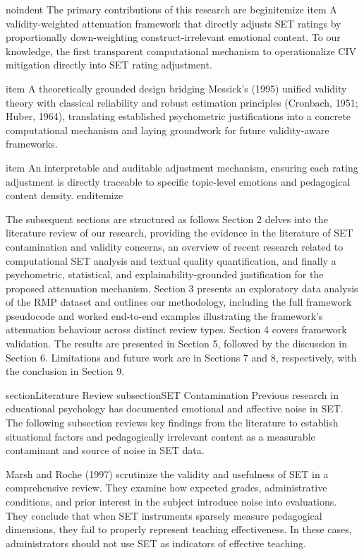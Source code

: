 noindent The primary contributions of this research are
begin{itemize}
    item A validity-weighted attenuation framework that directly adjusts SET ratings by proportionally down-weighting construct-irrelevant emotional content. To our knowledge, the first transparent computational mechanism to operationalize CIV mitigation directly into SET rating adjustment.

    item A theoretically grounded design bridging Messick's (1995) unified validity theory with classical reliability and robust estimation principles (Cronbach, 1951; Huber, 1964), translating established psychometric justifications into a concrete computational mechanism and laying groundwork for future validity-aware frameworks.

    item An interpretable and auditable adjustment mechanism, ensuring each rating adjustment is directly traceable to specific topic-level emotions and pedagogical content density. 
end{itemize}

The subsequent sections are structured as follows Section 2 delves into the literature review of our research, providing the evidence in the literature of SET contamination and validity concerns, an overview of recent research related to computational SET analysis and textual quality quantification, and finally a psychometric, statistical, and explainability-grounded justification for the proposed attenuation mechanism. Section 3 presents an exploratory data analysis of the RMP dataset and outlines our methodology, including the full framework pseudocode and worked end-to-end examples illustrating the framework's attenuation behaviour across distinct review types. Section 4 covers framework validation. The results are presented in Section 5, followed by the discussion in Section 6. Limitations and future work are in Sections 7 and 8, respectively, with the conclusion in Section 9. 

section{Literature Review}
subsection{SET Contamination}
Previous research in educational psychology has documented emotional and affective noise in SET. The following subsection reviews key findings from the literature to establish situational factors and pedagogically irrelevant content as a measurable contaminant and source of noise in SET data.

Marsh and Roche (1997) scrutinize the validity and usefulness of SET in a comprehensive review. They examine how expected grades, administrative conditions, and prior interest in the subject introduce noise into evaluations. They conclude that when SET instruments sparsely measure pedagogical dimensions, they fail to properly represent teaching effectiveness. In these cases, administrators should not use SET as indicators of effective teaching.

